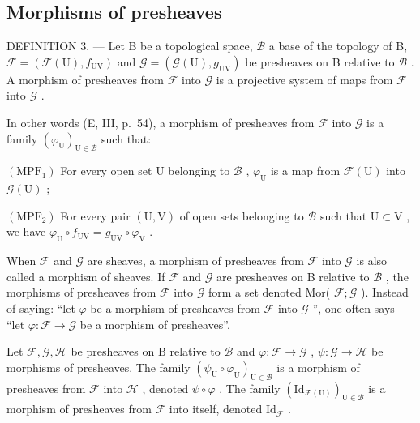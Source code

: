 \subsection{Morphisms of presheaves}

DEFINITION 3. --- Let B be a topological space, \(\mathcal{B}\) a base of the topology of B, \(\mathcal{F} = (\mathcal{F}(\mathrm{U}), f_{\mathrm{UV}})\) and \(\mathcal{G} = (\mathcal{G}(\mathrm{U}), g_{\mathrm{UV}})\) be presheaves on B relative to \(\mathcal{B}\) . A morphism of presheaves from \(\mathcal{F}\) into \(\mathcal{G}\) is a projective system of maps from \(\mathcal{F}\) into \(\mathcal{G}\) .

In other words (E, III, p.~54), a morphism of presheaves from \(\mathcal{F}\) into \(\mathcal{G}\) is a family \((\varphi_{\mathrm{U}})_{\mathrm{U}\in \mathcal{B}}\) such that:

\((\mathrm{MPF}_1)\) For every open set U belonging to \(\mathcal{B}\) , \(\varphi_{\mathrm{U}}\) is a map from \(\mathcal{F}(\mathrm{U})\) into \(\mathcal{G}(\mathrm{U})\) ;

\((\mathrm{MPF}_2)\) For every pair \((\mathrm{U},\mathrm{V})\) of open sets belonging to \(\mathcal{B}\) such that \(\mathrm{U}\subset \mathrm{V}\) , we have \(\varphi_{\mathrm{U}}\circ f_{\mathrm{UV}} = g_{\mathrm{UV}}\circ \varphi_{\mathrm{V}}\) .

When \(\mathcal{F}\) and \(\mathcal{G}\) are sheaves, a morphism of presheaves from \(\mathcal{F}\) into \(\mathcal{G}\) is also called a morphism of sheaves. If \(\mathcal{F}\) and \(\mathcal{G}\) are presheaves on B relative to \(\mathcal{B}\) , the morphisms of presheaves from \(\mathcal{F}\) into \(\mathcal{G}\) form a set denoted Mor( \(\mathcal{F};\mathcal{G}\) ). Instead of saying: “let \(\varphi\) be a morphism of presheaves from \(\mathcal{F}\) into \(\mathcal{G}\) ”, one often says “let \(\varphi\colon\mathcal{F}\to\mathcal{G}\) be a morphism of presheaves”.

Let \(\mathcal{F},\mathcal{G},\mathcal{H}\) be presheaves on B relative to \(\mathcal{B}\) and \(\varphi \colon \mathcal{F}\to \mathcal{G}\) , \(\psi \colon \mathcal{G}\to \mathcal{H}\) be morphisms of presheaves. The family \((\psi_{\mathrm{U}}\circ \varphi_{\mathrm{U}})_{\mathrm{U}\in \mathcal{B}}\) is a morphism of presheaves from \(\mathcal{F}\) into \(\mathcal{H}\) , denoted \(\psi \circ \varphi\) . The family \((\mathrm{Id}_{\mathcal{F}(\mathrm{U})})_{\mathrm{U}\in \mathcal{B}}\) is a morphism of presheaves from \(\mathcal{F}\) into itself, denoted \(\mathrm{Id}_{\mathcal{F}}\) .


